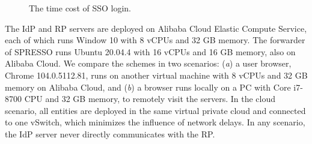 \begin{figure}[tb]
  \centering
  \caption{The time cost of SSO login.}
  \label{fig:evaluation}
\end{figure}


The IdP and RP servers are deployed on Alibaba Cloud Elastic Compute Service,
      each of which runs Window 10 with 8 vCPUs and 32 GB memory.
The forwarder of SPRESSO runs Ubuntu 20.04.4 with 16 vCPUs and 16 GB memory,
    also on Alibaba Cloud.
We compare the schemes in two scenarios:
    (\emph{a}) a user browser, Chrome 104.0.5112.81, runs on another virtual machine with 8 vCPUs and 32 GB memory on Alibaba Cloud,
        and (\emph{b}) a browser runs locally on a PC with Core i7-8700 CPU and 32 GB memory, to remotely visit the servers.
In the cloud scenario, all entities are deployed in the same virtual private cloud and connected to one vSwitch,
    which minimizes the influence of network delays.
In any scenario, the IdP server never directly communicates with the RP.


